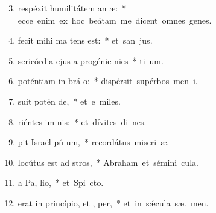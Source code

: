\begin{flushleft}
\begin{enumerate}[leftmargin=*]
\setcounter{enumi}{2}

\item {} respéxit humilitátem an æ:~* \mbox{ecce enim ex hoc beátam me dicent omnes genes.}
\item {} fecit mihi ma  tens est:~* \mbox{et san  jus.}
\item {}sericórdia ejus a progénie  nies~* \mbox{ti um.}
\item {} poténtiam in brá o:~* \mbox{dispérsit supérbos men  i.}
\item {}suit potén  de,~* \mbox{et e miles.}
\item {}riéntes im nis:~* \mbox{et dívites di nes.}
\item {}pit Israël pú um,~* \mbox{recordátus miseri æ.}
\item {} locútus est ad  stros,~* \mbox{Abraham et sémini   cula.}
\item {}a Pa,  lio,~* \mbox{et Spi cto.}
\item {} erat in princípio, et ,  per,~* \mbox{et in s\'{\ae}cula sæ. men.}

\end{enumerate}
\end{flushleft}

